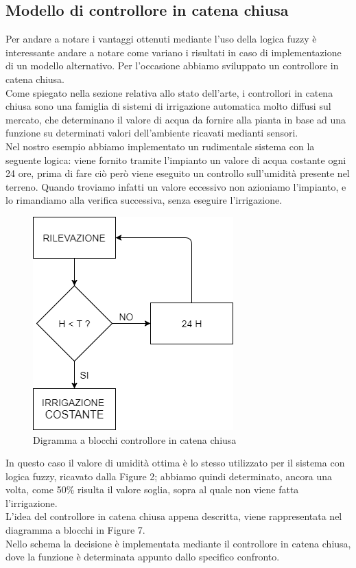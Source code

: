 \documentclass[conference,10pt]{IEEEtran}
\begin{document}
\subsection{Modello di controllore in catena chiusa}\label{sec:symo}
Per andare a notare i vantaggi ottenuti mediante l'uso della logica fuzzy è interessante andare a notare come variano i risultati in caso di implementazione di un modello alternativo. Per l'occasione abbiamo sviluppato un controllore in catena chiusa.\\
Come spiegato nella sezione relativa allo stato dell'arte, i controllori in catena chiusa sono una famiglia di sistemi di irrigazione automatica molto diffusi sul mercato, che determinano il valore di acqua da fornire alla pianta in base ad una funzione su determinati valori dell'ambiente ricavati medianti sensori.\\
Nel nostro esempio abbiamo implementato un rudimentale sistema con la seguente logica: viene fornito tramite l'impianto un valore di acqua costante ogni 24 ore, prima di fare ciò però viene eseguito un controllo sull'umidità presente nel terreno. Quando troviamo infatti un valore eccessivo non azioniamo l'impianto, e lo rimandiamo alla verifica successiva, senza eseguire l'irrigazione.
\begin{figure}[ht]
	\centering
	\includegraphics[width=0.6\linewidth]{images/ccc.png}
	\caption{Digramma a blocchi controllore in catena chiusa}
	\label{fig:MAD}
\end{figure}

In questo caso il valore di umidità ottima è lo stesso utilizzato per il sistema con logica fuzzy, ricavato dalla Figure 2; abbiamo quindi determinato, ancora una volta, come 50\% risulta il valore soglia, sopra al quale non viene fatta l'irrigazione.\\
L'idea del controllore in catena chiusa appena descritta, viene rappresentata nel diagramma a blocchi in Figure 7.\\
Nello schema la decisione è implementata mediante il controllore in catena chiusa, dove la funzione è determinata appunto dallo specifico confronto.
\end{document}
